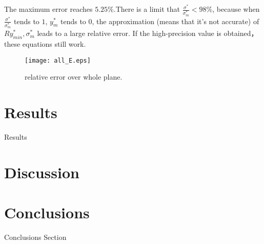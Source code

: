 \documentclass[review, 1p, number, sort&compress,table]{elsarticle}
\begin{document}
		The maximum error reaches $5.25\%$.There is a limit that $\frac{\sigma^*}{\sigma_m^*}<98\%$, because when $\frac{\sigma^*}{\sigma_m^*}$ tends to $1$, $y_m^*$ tends to $0$,  the approximation (means that it's not accurate) of $Ry_{min}^* , \sigma_m^*$ leads to a large relative error. If the high-precision value is obtained， these equations still work.
		\begin{figure}
				\centering	
				\texttt{[image: all\_E.eps]}
				\caption{relative error over whole plane.}	
				\label{fig:all_E}
		\end{figure}
	\section{Results}\label{sec:results}
	Results
	\section{Discussion}\label{sec:discussion}
	

	
	
	\section{Conclusions}
	\indent Conclusions Section
	
\end{document}
